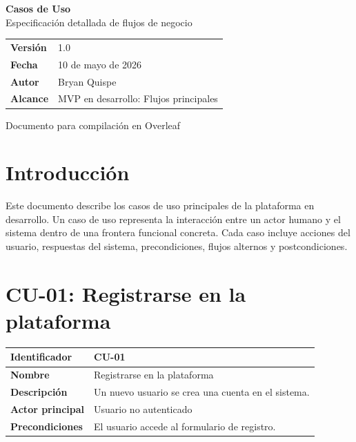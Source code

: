 \documentclass[12pt,a4paper]{article}
\author{Bryan Quispe}
\date{10 de mayo de 2026}
\begin{document}
\begin{titlepage}
\centering
\vspace*{1.8cm}
{\Huge\bfseries\color{PrimaryBlue} Casos de Uso\\[0.35em]}
{\LARGE Especificaci\'on detallada de flujos de negocio\\[1.2cm]}

\begin{tabular}{p{5cm} p{8cm}}
\rowcolor{SoftGray}
\textbf{Versi\'on} & 1.0 \\
\textbf{Fecha} & 10 de mayo de 2026 \\
\textbf{Autor} & Bryan Quispe \\
\textbf{Alcance} & MVP en desarrollo: Flujos principales \\
\end{tabular}

\vfill
{\large Documento para compilaci\'on en Overleaf}
\end{titlepage}

\tableofcontents
\newpage

\section{Introducci\'on}
Este documento describe los casos de uso principales de la plataforma en desarrollo. Un caso de uso representa la interacci\'on entre un actor humano y el sistema dentro de una frontera funcional concreta. Cada caso incluye acciones del usuario, respuestas del sistema, precondiciones, flujos alternos y postcondiciones.

\section{CU-01: Registrarse en la plataforma}

\begin{tabular}{|p{3.5cm}|p{10cm}|}
\hline
\textbf{Identificador} & CU-01 \\
\hline
\textbf{Nombre} & Registrarse en la plataforma \\
\hline
\textbf{Descripci\'on} & Un nuevo usuario se crea una cuenta en el sistema. \\
\hline
\textbf{Actor principal} & Usuario no autenticado \\
\hline
\textbf{Precondiciones} & El usuario accede al formulario de registro. \\
\hline
\end{tabular}

\vspace{0.5em}
\end{document}
